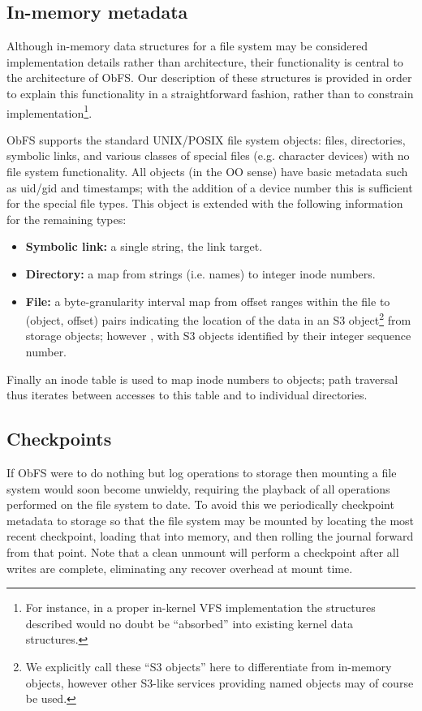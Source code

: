 \subsection{In-memory metadata}
Although in-memory data structures for a file system may be considered implementation details rather than architecture, their functionality is central to the architecture of ObFS.
Our description of these structures is provided in order to explain this functionality in a straightforward fashion, rather than to constrain implementation\footnote{For instance, in a proper in-kernel VFS implementation the structures described would no doubt be ``absorbed'' into existing kernel data structures.}.

ObFS supports the standard UNIX/POSIX file system objects: files, directories, symbolic links, and various classes of special files (e.g. character devices) with no file system functionality.
All objects (in the OO sense) have basic metadata such as uid/gid and timestamps; with the addition of a device number this is sufficient for the special file types.
This object is extended with the following information for the remaining types:
\begin{itemize}[nosep]
\item \textbf{Symbolic link:} a single string, the link target.
\item \textbf{Directory:} a map from strings (i.e. names) to integer inode numbers.
\item \textbf{File:} a byte-granularity interval map from offset ranges within the file to (object, offset) pairs indicating the location of the data in an S3 object\footnote{We explicitly call these ``S3 objects'' here to differentiate from in-memory objects, however other S3-like services providing named objects may of course be used.} from storage objects; however , with S3 objects identified by their integer sequence number.
\end{itemize}

Finally an inode table is used to map inode numbers to objects; path traversal thus iterates between accesses to this table and to individual directories.

\subsection{Checkpoints}

If ObFS were to do nothing but log operations to storage then mounting a file system would soon become unwieldy, requiring the playback of all operations performed on the file system to date.
To avoid this we periodically checkpoint metadata to storage so that the file system may be mounted by locating the most recent checkpoint, loading that into memory, and then rolling the journal forward from that point.
Note that a clean unmount will perform a checkpoint after all writes are complete, eliminating any recover overhead at mount time.

